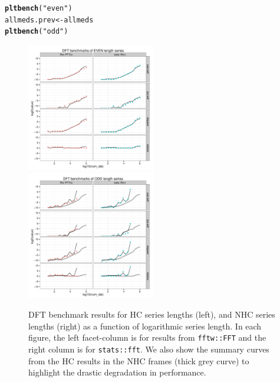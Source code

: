\documentclass[12pt]{article}\usepackage{graphicx, color}
\makeatletter
\newcommand{\hlfunctioncall}[1]{\textcolor[rgb]{0.501960784313725,0,0.329411764705882}{\textbf{#1}}}%
\newcommand{\hlstring}[1]{\textcolor[rgb]{0.6,0.6,1}{#1}}%
\newenvironment{kframe}{%
 \def\at@end@of@kframe{}%
 \ifinner\ifhmode%
  \def\at@end@of@kframe{\end{minipage}}%
  \begin{minipage}{\columnwidth}%
 \fi\fi%
 \def\FrameCommand##1{\hskip\@totalleftmargin \hskip-\fboxsep
 \colorbox{shadecolor}{##1}\hskip-\fboxsep
     \hskip-\linewidth \hskip-\@totalleftmargin \hskip\columnwidth}%
 \MakeFramed {\advance\hsize-\width
   \@totalleftmargin\z@ \linewidth\hsize
   \@setminipage}}%
 {\par\unskip\endMakeFramed%
 \at@end@of@kframe}
\newenvironment{knitrout}{}{} %
\newcommand{\Rcmd}[1]{\texttt{#1}}
\makeatother
\begin{document}
\begin{knitrout}
\color{fgcolor}\begin{kframe}
\begin{alltt}
\hlfunctioncall{pltbench}(\hlstring{"even"})
allmeds.prev <- allmeds
\hlfunctioncall{pltbench}(\hlstring{"odd"})
\end{alltt}
\end{kframe}
\end{knitrout}


\begin{figure}[htb!]
\begin{center}
\includegraphics[width=0.5\textwidth]{fftw_bench_even}%
\includegraphics[width=0.5\textwidth]{fftw_bench_odd}
\caption{ DFT benchmark results for HC series lengths (left),
and NHC series lengths (right) as a function of logarithmic
series length.  In each figure, the left
facet-column is for results from \Rcmd{fftw::FFT} and the right
column is for \Rcmd{stats::fft}.
We also show the summary curves from the HC results
in the NHC frames (thick grey curve)
to highlight the drastic degradation in performance.}
\label{fig:results}
\end{center}
\end{figure}
\end{document}

